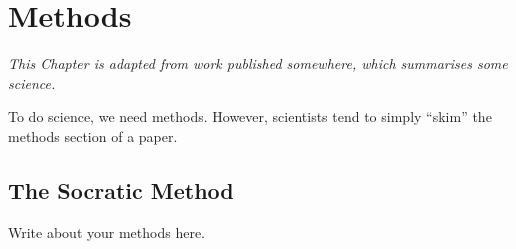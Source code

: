 \chapter{Methods}
\label{chapter:methods}

\begin{center}
    \textit{This Chapter is adapted from work published somewhere, which summarises some science.}
\end{center}

To do science, we need methods. However, scientists tend to simply ``skim'' the methods section of a paper.

\section{The Socratic Method}
Write about your methods here.
